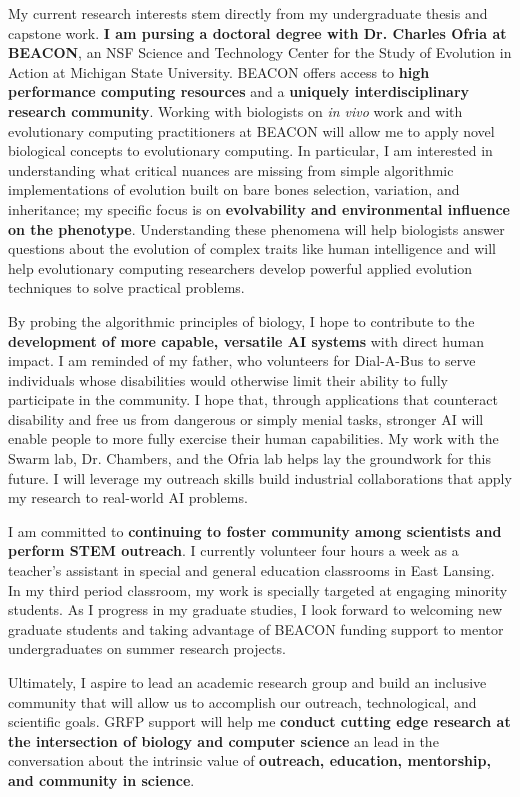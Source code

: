 \noindent
\underline{}
My current research interests stem directly from my undergraduate thesis and capstone work.
\textbf{I am pursing a doctoral degree with Dr. Charles Ofria at BEACON}, an NSF Science and Technology Center for the Study of Evolution in Action at Michigan State University.
BEACON offers access to \textbf{high performance computing resources} and a \textbf{uniquely interdisciplinary research community}.
Working with biologists on \textit{in vivo} work and with evolutionary computing practitioners at BEACON will allow me to apply novel biological concepts to evolutionary computing.
In particular, I am interested in understanding what critical nuances are missing from simple algorithmic implementations of evolution built on bare bones selection, variation, and inheritance;
my specific focus is on \textbf{evolvability and environmental influence on the phenotype}.
Understanding these phenomena will help biologists answer questions about the evolution of complex traits like human intelligence and will help evolutionary computing researchers develop powerful applied evolution techniques to solve practical problems.

By probing the algorithmic principles of biology, I hope to contribute to the \textbf{development of more capable, versatile AI systems} with direct human impact.
I am reminded of my father, who volunteers for Dial-A-Bus to serve individuals whose disabilities would otherwise limit their ability to fully participate in the community.
I hope that, through applications that counteract disability and free us from dangerous or simply menial tasks, stronger AI will enable people to more fully exercise their human capabilities.
My work with the Swarm lab, Dr. Chambers, and the Ofria lab helps lay the groundwork for this future.
I will leverage my outreach skills build industrial collaborations that apply my research to real-world AI problems.

I am committed to \textbf{continuing to foster community among scientists and perform STEM outreach}.
I currently volunteer four hours a week as a teacher's assistant in special and general education classrooms in East Lansing.
In my third period classroom, my work is specially targeted at engaging minority students.
As I progress in my graduate studies, I look forward to welcoming new graduate students and taking advantage of BEACON funding support to mentor undergraduates on summer research projects.

Ultimately, I aspire to lead an academic research group and build an inclusive community that will allow us to accomplish our outreach, technological, and scientific goals.
GRFP support will help me \textbf{conduct cutting edge research at the intersection of biology and computer science} an lead in the conversation about the intrinsic value of \textbf{outreach, education, mentorship, and community in science}.
